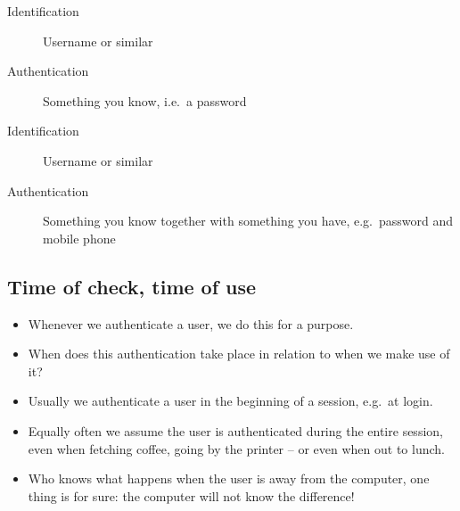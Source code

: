 \begin{frame}
  \begin{example}
    \begin{description}
      \item[Identification] Username or similar
      \item[Authentication] Something you know, i.e.\ a password
    \end{description}
  \end{example}

  \pause{}

  \begin{example}
    \begin{description}
      \item[Identification] Username or similar
      \item[Authentication] Something you know together with something you 
        have, e.g.\ password and mobile phone
    \end{description}
  \end{example}
\end{frame}

\subsection{Time of check, time of use}

\begin{frame}
  \begin{exercise}
    \begin{itemize}
      \item Whenever we authenticate a user, we do this for a purpose.

      \item When does this authentication take place in relation to when we make 
        use of it?
    \end{itemize}
  \end{exercise}
\end{frame}

\begin{frame}
  \begin{example}
    \begin{itemize}
      \item Usually we authenticate a user in the beginning of a session, e.g.\ 
        at login.

      \item Equally often we assume the user is authenticated during the entire 
        session, even when fetching coffee, going by the printer -- or even when 
        out to lunch.

      \item Who knows what happens when the user is away from the computer, one 
        thing is for sure: the computer will not know the difference!

    \end{itemize}
  \end{example}
\end{frame}

